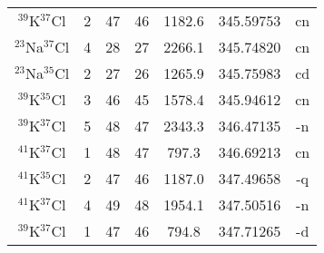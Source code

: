 \begin{table*}[htp]
\begin{tabular}{ccccccc}
$^{39}$K$^{37}$Cl & 2 & 47 & 46 & 1182.6 & 345.59753 & cn \\
$^{23}$Na$^{37}$Cl & 4 & 28 & 27 & 2266.1 & 345.74820 & cn \\
$^{23}$Na$^{35}$Cl & 2 & 27 & 26 & 1265.9 & 345.75983 & cd \\
$^{39}$K$^{35}$Cl & 3 & 46 & 45 & 1578.4 & 345.94612 & cn \\
$^{39}$K$^{37}$Cl & 5 & 48 & 47 & 2343.3 & 346.47135 & -n \\
$^{41}$K$^{37}$Cl & 1 & 48 & 47 & 797.3 & 346.69213 & cn \\
$^{41}$K$^{35}$Cl & 2 & 47 & 46 & 1187.0 & 347.49658 & -q \\
$^{41}$K$^{37}$Cl & 4 & 49 & 48 & 1954.1 & 347.50516 & -n \\
$^{39}$K$^{37}$Cl & 1 & 47 & 46 & 794.8 & 347.71265 & -d \\
\hline
\end{tabular}

\par 
\end{table*}
